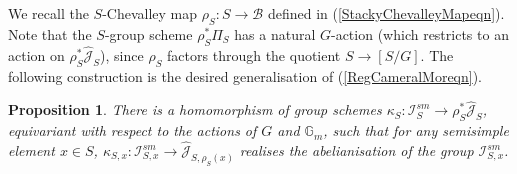\documentclass{amsart}
\newtheorem{proposition}[theorem]{Proposition}
\theoremstyle{remark}
\numberwithin{theorem}{section}
\numberwithin{equation}{section}
\begin{document}
 We recall the $S$-Chevalley map $\rho_S:S \rightarrow \mathcal B$ defined in (\ref{StackyChevalleyMapeqn}). Note that the $S$-group scheme $\rho_S^*\Pi_S$ has a natural $G$-action (which restricts to an action on $\rho_S^*\hat{\mathcal J}_S$), since $\rho_S$ factors through the quotient $S \rightarrow [S/G]$. The following construction is the desired generalisation of (\ref{RegCameralMoreqn}).

\begin{proposition}\label{CameralHomprp}
There is a homomorphism of group schemes $\kappa_S:\mathcal I^{sm}_S \rightarrow \mathcal \rho_S^*\hat{\mathcal J}_S$, equivariant with respect to the actions of $G$ and $\mathbb{G}_m$, such that for any semisimple element $x \in S$, $\kappa_{S,x}: \mathcal I^{sm}_{S,x} \rightarrow \hat{\mathcal J}_{S, \rho_S(x)}$ realises the abelianisation of the group $\mathcal I^{sm}_{S,x}$.
\end{proposition}
\end{document}
